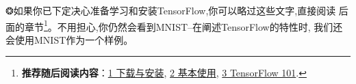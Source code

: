 ❂如果你已下定决心准备学习和安装TensorFlow,你可以略过这些文字,直接阅读
后面的章节\footnote{\textbf{推荐随后阅读内容}：\hyperref[download_install]{1 下载与安装}, \hyperref[basic_usage]{2 基本使用}, \hyperref[tf_mech101]{3 TensorFlow 101}.}。不用担心,你仍然会看到MNIST--在阐述TensorFlow的特性时,
我们还会使用MNIST作为一个样例。




